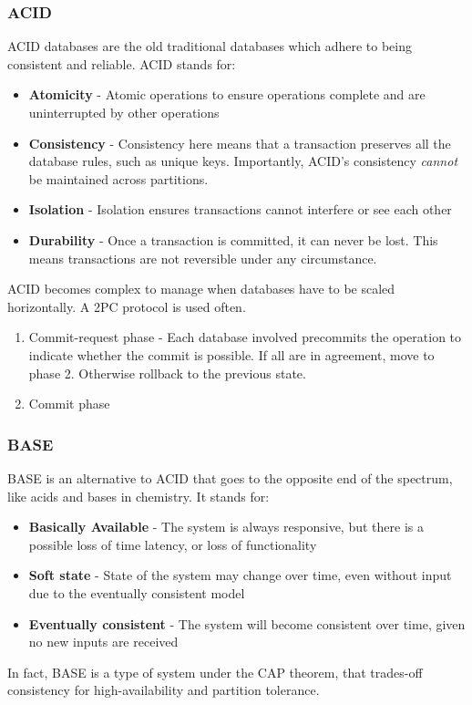 \documentclass{sty/SizheArticle}
\begin{document}
\subsubsection{ACID}
ACID databases are the old traditional databases which adhere to being
consistent and reliable. ACID stands for:
\begin{itemize}
\item \textbf{Atomicity} - Atomic operations to ensure operations complete
and are uninterrupted by other operations
\item \textbf{Consistency} - Consistency here means that a transaction
preserves all the database rules, such as unique keys. Importantly, ACID's
consistency \textit{cannot} be maintained across partitions.
\item \textbf{Isolation} - Isolation ensures transactions cannot interfere or
see each other
\item \textbf{Durability} - Once a transaction is committed, it can never
be lost. This means transactions are not reversible under any circumstance.
\end{itemize}
ACID becomes complex to manage when databases have to be scaled horizontally.
A 2PC protocol is used often.
\begin{enumerate}
\item Commit-request phase - Each database involved precommits the operation
to indicate whether the commit is possible. If all are in agreement, move to
phase 2. Otherwise rollback to the previous state.
\item Commit phase
\end{enumerate}

\subsubsection{BASE}
BASE is an alternative to ACID that goes to the opposite end of the spectrum,
like acids and bases in chemistry.
It stands for:
\begin{itemize}
\item \textbf{Basically Available} - The system is always responsive, but there
is a possible loss of time latency, or loss of functionality
\item \textbf{Soft state} - State of the system may change over time, even
without input due to the eventually consistent model
\item \textbf{Eventually consistent} - The system will become consistent over
time, given no new inputs are received
\end{itemize}
In fact, BASE is a type of system under the CAP theorem, that trades-off
consistency for high-availability and partition tolerance.
\end{document}
